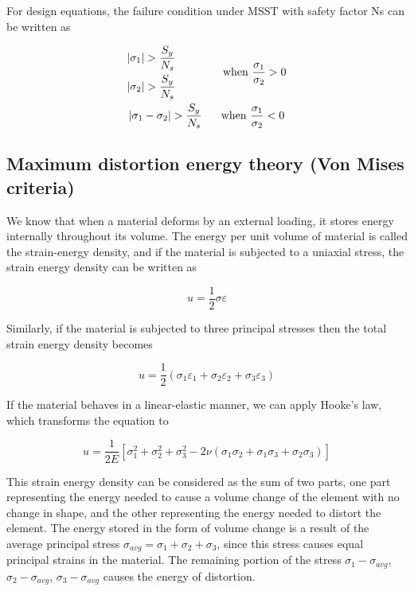 \documentclass[a4paper,openany,12pt]{book}
\begin{document}
For design equations, the failure condition under MSST with safety
factor Ns can be written as

$$\begin{gathered}
    \begin{gathered}
        \left| \sigma_1 \right| > \frac{S_y}{N_s} \\
        \left| \sigma_2 \right| > \frac{S_y}{N_s}  \\ 
      \end{gathered}  \hspace{1.5cm} \text{when } \dfrac{\sigma _1}{\sigma _2} > 0 \\
      \left| {\sigma _1} - {\sigma _2} \right| > \frac{S_y}{N_s} \hspace{0.6cm} \text{when } \dfrac{\sigma_1}{\sigma_2} < 0
  \end{gathered}$$

\subsection{Maximum distortion energy theory (Von Mises criteria)}
\label{maximum-distortion-energy-theory-von-mises-criteria}
We know that when a material deforms by an external loading, it stores
energy internally throughout its volume. The energy per unit volume of
material is called the strain-energy density, and if the material is
subjected to a uniaxial stress, the strain energy density can be written
as

$$u = \frac{1}{2}\sigma \varepsilon$$

Similarly, if the material is subjected to three principal stresses then
the total strain energy density becomes

$$u = \frac{1}{2}(\sigma_1\varepsilon_1 + \sigma_2\varepsilon_2 + \sigma_3\varepsilon_3)$$

If the material behaves in a linear-elastic manner, we can apply Hooke's
law, which transforms the equation to

$$ u = \frac{1}{2E}\left[\sigma_1^2 + \sigma_2^2 + \sigma_3^2 - 2\nu (\sigma_1\sigma_2 + \sigma_1\sigma_3 + \sigma_2\sigma_3)\right]$$

This strain energy density can be considered as the sum of two parts,
one part representing the energy needed to cause a volume change of the
element with no change in shape, and the other representing the energy
needed to distort the element. The energy stored in the form of volume
change is a result of the average principal stress
\(\sigma_{avg} = \sigma_1 + \sigma_2 + \sigma_3\), since this stress
causes equal principal strains in the material. The remaining portion of
the stress \(\sigma_1 - \sigma_{avg}\), \(\sigma_2 - \sigma_{avg}\),
\(\sigma_3 - \sigma_{avg}\) causes the energy of distortion.
\end{document}
